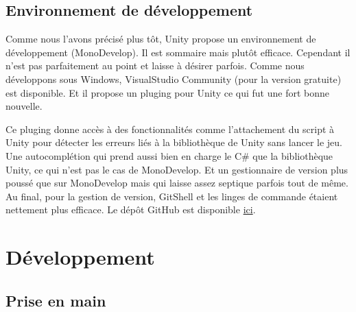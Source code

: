 \documentclass[a4paper,11pt]{myreport}
\begin{document}
\subsection{Environnement de développement}
\par Comme nous l'avons précisé plus tôt, Unity propose un environnement de développement (MonoDevelop). Il est sommaire mais plutôt efficace. Cependant il n'est pas parfaitement au point et laisse à désirer parfois.
Comme nous développons sous Windows, VisualStudio Community (pour la version gratuite) est disponible. Et il propose un pluging pour Unity ce qui fut une fort bonne nouvelle.
\par Ce pluging donne accès à des fonctionnalités comme l'attachement du script à Unity pour détecter les erreurs liés à la bibliothèque de Unity sans lancer le jeu. Une autocomplétion qui prend aussi bien en charge le C\# que la bibliothèque Unity, ce qui n'est pas le cas de MonoDevelop. Et un gestionnaire de version plus poussé que sur MonoDevelop mais qui laisse assez septique parfois tout de même.
Au final, pour la gestion de version, GitShell et les linges de commande étaient nettement plus efficace. Le dépôt GitHub est disponible \href{https://github.com/manumanmax/SeriousVR.git}{ici}.

\section{Développement}
\subsection{Prise en main}
\end{document}
